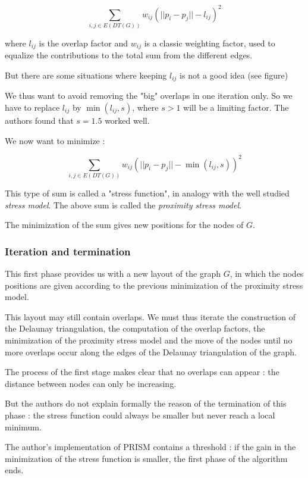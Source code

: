 \documentclass[12pt]{report}
\begin{document}
\[ \sum_{i,j \in E(DT(G))} w_{ij}(||p_i - p_j|| - l_{ij})^2\]

where $l_{ij}$ is the overlap factor and $w_{ij}$ is a classic weighting factor, used to equalize the contributions to the total sum from the different edges.

But there are some situations where keeping $l_{ij}$ is not a good idea (see figure) %

We thus want to avoid removing the "big" overlaps in one iteration only.
So we have to replace $l_{ij}$ by $\min(l_{ij},s)$, where $s > 1$ will be a limiting factor. The authors found that $s = 1.5$ worked well.

We now want to minimize :

\[ \sum_{i,j \in E(DT(G))} w_{ij}(||p_i - p_j|| - \min(l_{ij},s))^2\]

This type of sum is called a "stress function", in analogy with the well studied \emph{stress model}. %
The above sum is called the \emph{proximity stress model}.

\bigskip
The minimization of the sum gives new positions for the nodes of $G$.

\subsubsection{Iteration and termination}
This first phase provides us with a new layout of the graph $G$, in which the nodes positions are given according to the previous minimization of the proximity stress model.

This layout may still contain overlaps. We must thus iterate the construction of the Delaunay triangulation, the computation of the overlap factors, the minimization of the proximity stress model and the move of the nodes until no more overlaps occur along the edges of the Delaunay triangulation of the graph.

\bigskip
The process of the first stage makes clear that no overlaps can appear : the distance between nodes can only be increasing. 

But the authors do not explain formally the reason of the termination of this phase : the stress function could always be smaller but never reach a local minimum.

The author's implementation of PRISM contains a threshold : if the gain in the minimization of the stress function is smaller, the first phase of the algorithm ends.

\end{document}
